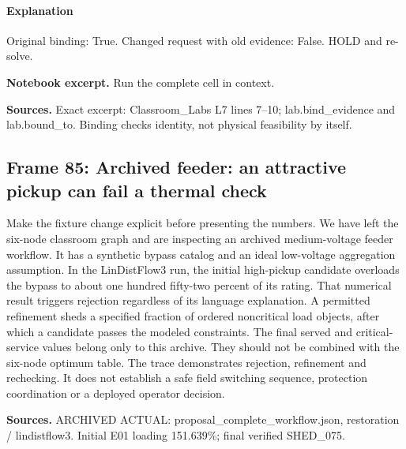 \documentclass[11pt]{article}
\begin{document}
\paragraph{Explanation}Original binding: True. Changed request with old evidence: False. HOLD and re-solve.
\par\noindent\begin{minipage}{\linewidth}\textbf{Notebook excerpt.} Run the complete cell in context.\par \end{minipage}\par
\par\nopagebreak\begin{minipage}{\linewidth}{\footnotesize\color{slate}\textbf{Sources.} Exact excerpt: Classroom\_Labs L7 lines 7--10; lab.bind\_evidence and lab.bound\_to. Binding checks identity, not physical feasibility by itself.\par}\end{minipage}\par\medskip
\subsection*{Frame 85: Archived feeder: an attractive pickup can fail a thermal check}
Make the fixture change explicit before presenting the numbers. We have left the six-node classroom graph and are inspecting an archived medium-voltage feeder workflow. It has a synthetic bypass catalog and an ideal low-voltage aggregation assumption. In the LinDistFlow3 run, the initial high-pickup candidate overloads the bypass to about one hundred fifty-two percent of its rating. That numerical result triggers rejection regardless of its language explanation. A permitted refinement sheds a specified fraction of ordered noncritical load objects, after which a candidate passes the modeled constraints. The final served and critical-service values belong only to this archive. They should not be combined with the six-node optimum table. The trace demonstrates rejection, refinement and rechecking. It does not establish a safe field switching sequence, protection coordination or a deployed operator decision.\par
\par\nopagebreak\begin{minipage}{\linewidth}{\footnotesize\color{slate}\textbf{Sources.} ARCHIVED ACTUAL: proposal\_complete\_workflow.json, restoration / lindistflow3. Initial E01 loading 151.639\%; final verified SHED\_075.\par}\end{minipage}\par\medskip
\end{document}
